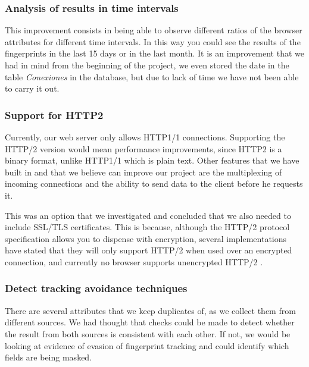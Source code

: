\subsubsection{Analysis of results in time intervals}
This improvement consists in being able to observe different ratios of the browser attributes for different time intervals. In this way you could see the results of the fingerprints in the last 15 days or in the last month. It is an improvement that we had in mind from the beginning of the project, we even stored the date in the table \textit{Conexiones} in the database, but due to lack of time we have not been able to carry it out.

\subsubsection{Support for HTTP2}
Currently, our web server only allows HTTP1/1 connections. Supporting the HTTP/2 version would mean performance improvements, since HTTP2 is a binary format, unlike HTTP1/1 which is plain text. Other features that we have built in and that we believe can improve our project are the multiplexing of incoming connections and the ability to send data to the client before he requests it. \par
This was an option that we investigated and concluded that we also needed to include SSL/TLS certificates. This is because, although the HTTP/2 protocol specification allows you to dispense with encryption, several implementations have stated that they will only support HTTP/2 when used over an encrypted connection, and currently no browser supports unencrypted HTTP/2 \cite{http2}. \par
\subsubsection{Detect tracking avoidance techniques}
There are several attributes that we keep duplicates of, as we collect them from different sources. We had thought that checks could be made to detect whether the result from both sources is consistent with each other. If not, we would be looking at evidence of evasion of fingerprint tracking and could identify which fields are being masked.
\noindent

